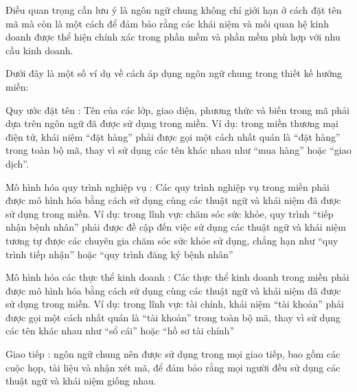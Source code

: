 Điều quan trọng cần lưu ý là ngôn ngữ chung không chỉ giới hạn ở cách đặt tên mã mà còn là một cách để đảm bảo rằng các khái niệm và mối quan hệ kinh doanh được thể hiện chính xác trong phần mềm và phần mềm phù hợp với nhu cầu kinh doanh.

Dưới đây là một số ví dụ về cách áp dụng ngôn ngữ chung trong thiết kế hướng miền:

Quy ước đặt tên : Tên của các lớp, giao diện, phương thức và biến trong mã phải dựa trên ngôn ngữ đã được sử dụng trong miền. Ví dụ: trong miền thương mại điện tử, khái niệm “đặt hàng” phải được gọi một cách nhất quán là “đặt hàng” trong toàn bộ mã, thay vì sử dụng các tên khác nhau như “mua hàng” hoặc “giao dịch”.

Mô hình hóa quy trình nghiệp vụ : Các quy trình nghiệp vụ trong miền phải được mô hình hóa bằng cách sử dụng cùng các thuật ngữ và khái niệm đã được sử dụng trong miền. Ví dụ: trong lĩnh vực chăm sóc sức khỏe, quy trình “tiếp nhận bệnh nhân” phải được đề cập đến việc sử dụng các thuật ngữ và khái niệm tương tự được các chuyên gia chăm sóc sức khỏe sử dụng, chẳng hạn như “quy trình tiếp nhận” hoặc “quy trình đăng ký bệnh nhân”

Mô hình hóa các thực thể kinh doanh : Các thực thể kinh doanh trong miền phải được mô hình hóa bằng cách sử dụng cùng các thuật ngữ và khái niệm đã được sử dụng trong miền. Ví dụ: trong lĩnh vực tài chính, khái niệm “tài khoản” phải được gọi một cách nhất quán là “tài khoản” trong toàn bộ mã, thay vì sử dụng các tên khác nhau như “sổ cái” hoặc “hồ sơ tài chính”

Giao tiếp : ngôn ngữ chung nên được sử dụng trong mọi giao tiếp, bao gồm các cuộc họp, tài liệu và nhận xét mã, để đảm bảo rằng mọi người đều sử dụng các thuật ngữ và khái niệm giống nhau.





